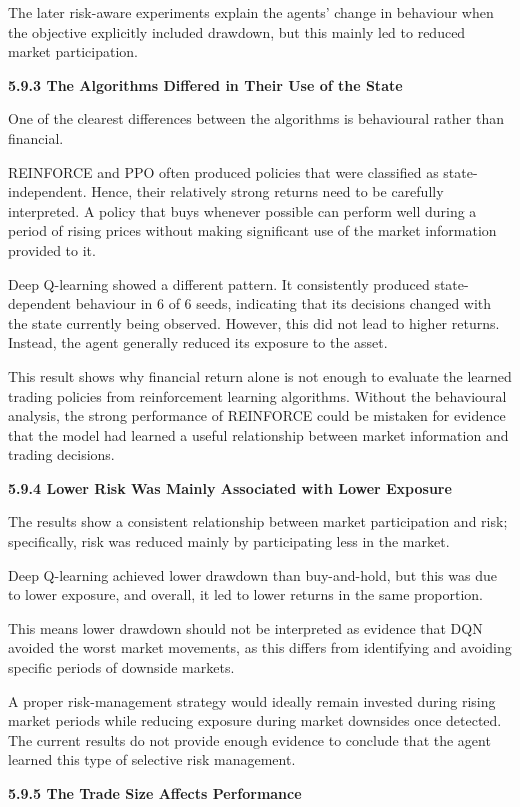 The later risk-aware experiments explain the agents' change in behaviour
when the objective explicitly included drawdown, but this mainly led to
reduced market participation.

\textbf{5.9.3 The Algorithms Differed in Their Use of the State}

One of the clearest differences between the algorithms is behavioural
rather than financial.

REINFORCE and PPO often produced policies that were classified as
state-independent. Hence, their relatively strong returns need to be
carefully interpreted. A policy that buys whenever possible can perform
well during a period of rising prices without making significant use of
the market information provided to it.

Deep Q-learning showed a different pattern. It consistently produced
state-dependent behaviour in 6 of 6 seeds, indicating that its decisions
changed with the state currently being observed. However, this did not
lead to higher returns. Instead, the agent generally reduced its
exposure to the asset.

This result shows why financial return alone is not enough to evaluate
the learned trading policies from reinforcement learning algorithms.
Without the behavioural analysis, the strong performance of REINFORCE
could be mistaken for evidence that the model had learned a useful
relationship between market information and trading decisions.

\textbf{5.9.4 Lower Risk Was Mainly Associated with Lower Exposure}

The results show a consistent relationship between market participation
and risk; specifically, risk was reduced mainly by participating less in
the market.

Deep Q-learning achieved lower drawdown than buy-and-hold, but this was
due to lower exposure, and overall, it led to lower returns in the same
proportion.

This means lower drawdown should not be interpreted as evidence that DQN
avoided the worst market movements, as this differs from identifying and
avoiding specific periods of downside markets.

A proper risk-management strategy would ideally remain invested during
rising market periods while reducing exposure during market downsides
once detected. The current results do not provide enough evidence to
conclude that the agent learned this type of selective risk management.

\textbf{5.9.5 The Trade Size Affects Performance}

